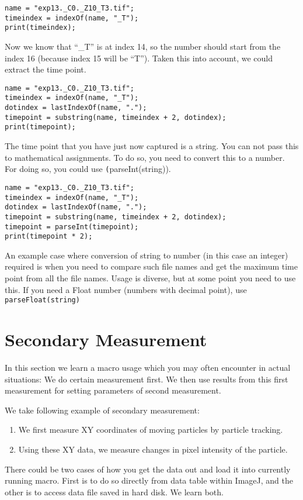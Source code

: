\documentclass[11pt,a4paper,oneside]{report}
\newcommand{\ilcom}[1]{\texttt{\small#1}}
\begin{document}
\begin{lstlisting}
name = "exp13._C0._Z10_T3.tif";
timeindex = indexOf(name, "_T");
print(timeindex);
\end{lstlisting}

Now we know that ``\_T'' is at index 14, so the number should start from the index 16 (because index 15 will be ``T''). Taken this into account, we could extract the time point. 

\begin{lstlisting}
name = "exp13._C0._Z10_T3.tif";
timeindex = indexOf(name, "_T");
dotindex = lastIndexOf(name, ".");
timepoint = substring(name, timeindex + 2, dotindex);
print(timepoint);
\end{lstlisting}

The time point that you have just now captured is a string. You can not pass this to mathematical assignments. To do so, you need to convert this to a number. For doing so, you could use \ilcom(parseInt(string)). 

\begin{lstlisting}
name = "exp13._C0._Z10_T3.tif";
timeindex = indexOf(name, "_T");
dotindex = lastIndexOf(name, ".");
timepoint = substring(name, timeindex + 2, dotindex);
timepoint = parseInt(timepoint);
print(timepoint * 2);
\end{lstlisting}

An example case where conversion of string to number (in this case an integer) required is when you need to compare such file names and get the maximum time point from all the file names. Usage is diverse, but at some point you need to use this. If you need a Float number (numbers with decimal point), use \ilcom{parseFloat(string)}


\section{Secondary Measurement}
In this section we learn a macro usage which you may often encounter in actual situations: 
We do certain measurement first. We then use results from this first measurement for 
setting parameters of second measurement.  

We take following example of secondary measurement: 
\begin{enumerate}
\item We first measure XY coordinates of moving particles by particle tracking.  
\item Using these XY data, we measure changes in pixel intensity of the particle.
\end{enumerate} 
There could be two cases of how you get the data out and load it into currently running macro. 
First is to do so directly from data table within ImageJ, 
and the other is to access data file saved in hard disk. We learn both. 
\end{document}
